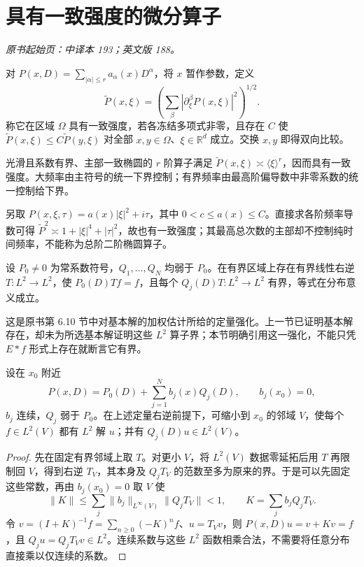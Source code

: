\section{具有一致强度的微分算子}\label{sec:yosida-06-11}
\noindent\textit{原书起始页：中译本 193；英文版 188。}

对 $P(x,D)=\sum_{|\alpha|\le r}a_\alpha(x)D^\alpha$，将 $x$ 暂作参数，定义
\[
 \widetilde P(x,\xi)=\left(\sum_\beta|\partial_\xi^\beta P(x,\xi)|^2\right)^{1/2}.
\]
称它在区域 $\Omega$ 具有一致强度，若各冻结多项式非零，且存在 $C$ 使
$\widetilde P(x,\xi)\le C\widetilde P(y,\xi)$ 对全部 $x,y\in\Omega$、$\xi\in\mathbb R^d$ 成立。交换 $x,y$ 即得双向比较。

\begin{example}[椭圆与抛物型模型]
光滑且系数有界、主部一致椭圆的 $r$ 阶算子满足
$\widetilde P(x,\xi)\asymp\langle\xi\rangle^r$，因而具有一致强度。大频率由主符号的统一下界控制；有界频率由最高阶偏导数中非零系数的统一控制给下界。

另取 $P(x,\xi,\tau)=a(x)|\xi|^2+i\tau$，其中 $0<c\le a(x)\le C$。直接求各阶频率导数可得
$\widetilde P^2\asymp1+|\xi|^4+|\tau|^2$，故也有一致强度；其最高总次数的主部却不控制纯时间频率，不能称为总阶二阶椭圆算子。
\end{example}

\begin{theorem}\label{thm:y6-right-inverse}
设 $P_0\ne0$ 为常系数符号，$Q_1,\ldots,Q_N$ 均弱于 $P_0$。在有界区域上存在有界线性右逆 $T:L^2\to L^2$，使 $P_0(D)Tf=f$，且每个 $Q_j(D)T:L^2\to L^2$ 有界，等式在分布意义成立。
\end{theorem}

这是原书第 6.10 节中对基本解的加权估计所给的定量强化。上一节已证明基本解存在，却未为所选基本解证明这些 $L^2$ 算子界；本节明确引用这一强化，不能只凭 $E*f$ 形式上存在就断言它有界。

\begin{proposition}[小扰动的局部可解性]\label{prop:y6-perturbation}
设在 $x_0$ 附近
\[
 P(x,D)=P_0(D)+\sum_{j=1}^Nb_j(x)Q_j(D),\qquad b_j(x_0)=0,
\]
$b_j$ 连续，$Q_j$ 弱于 $P_0$。在上述定量右逆前提下，可缩小到 $x_0$ 的邻域 $V$，使每个 $f\in L^2(V)$ 都有 $L^2$ 解 $u$；并有 $Q_j(D)u\in L^2(V)$。
\end{proposition}
\begin{proof}
先在固定有界邻域上取 $T$。对更小 $V$，将 $L^2(V)$ 数据零延拓后用 $T$ 再限制回 $V$，得到右逆 $T_V$，其本身及 $Q_jT_V$ 的范数至多为原来的界。于是可以先固定这些常数，再由 $b_j(x_0)=0$ 取 $V$ 使
\[
 \|K\|\le\sum_j\|b_j\|_{L^\infty(V)}\|Q_jT_V\|<1,
 \qquad K=\sum_jb_jQ_jT_V.
\]
令 $v=(I+K)^{-1}f=\sum_{n\ge0}(-K)^nf$、$u=T_Vv$，则 $P(x,D)u=v+Kv=f$，且 $Q_ju=Q_jT_Vv\in L^2$。连续系数与这些 $L^2$ 函数相乘合法，不需要将任意分布直接乘以仅连续的系数。
\end{proof}


